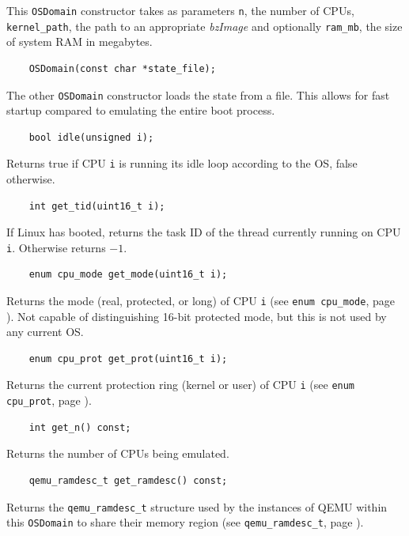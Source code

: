 \documentclass[letterpaper, 10pt]{book}
\begin{document}
This \texttt{OSDomain} constructor takes as parameters \texttt{n}, the number of
CPUs, \texttt{kernel\_path}, the path to an appropriate \emph{bzImage} and 
optionally \texttt{ram\_mb}, the size of system RAM in megabytes. 

\begin{verbatim}
    OSDomain(const char *state_file);
\end{verbatim}

The other \texttt{OSDomain} constructor loads the state from a file. This allows
for fast startup compared to emulating the entire boot process.

\label{func:idle} \begin{verbatim}
    bool idle(unsigned i);
\end{verbatim}

Returns true if CPU \texttt{i} is running its idle loop according to the OS,
false otherwise.

\label{func:get_tid} \begin{verbatim}
    int get_tid(uint16_t i);
\end{verbatim}

If Linux has booted, returns the task ID of the thread currently running on CPU
\texttt{i}. Otherwise returns $-1$.

\label{func:get_mode} \begin{verbatim}
    enum cpu_mode get_mode(uint16_t i);
\end{verbatim}
Returns the mode (real, protected, or long) of CPU \texttt{i} (see 
\texttt{enum cpu\_mode}, page \pageref{enum:cpu_mode}). Not capable of 
distinguishing 16-bit protected mode, but this is not used by any current OS.

\label{func:get_proc} \begin{verbatim}
    enum cpu_prot get_prot(uint16_t i);
\end{verbatim}
Returns the current protection ring (kernel or user) of CPU \texttt{i} (see
\texttt{enum cpu\_prot}, page \pageref{enum:cpu_prot}).

\label{func:get_n} \begin{verbatim}
    int get_n() const;
\end{verbatim}
Returns the number of CPUs being emulated.

\label{func:get_ramdesc} \begin{verbatim}
    qemu_ramdesc_t get_ramdesc() const;
\end{verbatim}
Returns the \texttt{qemu\_ramdesc\_t} structure used by the instances of QEMU
within this \texttt{OSDomain} to share their memory region (see 
\texttt{qemu\_ramdesc\_t}, page \pageref{struct:qemu_ramdesc_t}).
\end{document}
